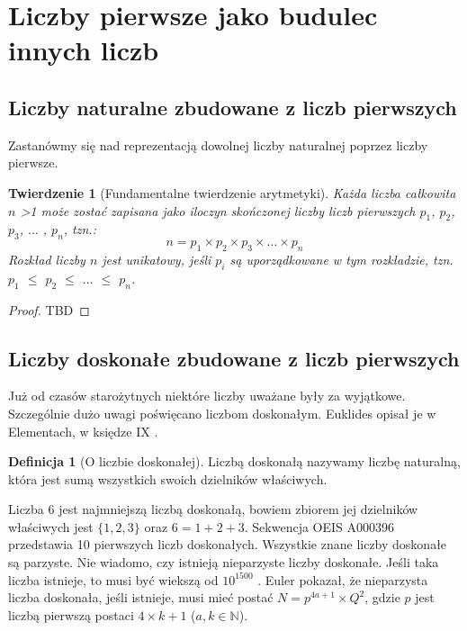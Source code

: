 \documentclass[10pt,onecolumn]{article}
\newtheorem{theorem}{Twierdzenie}
\theoremstyle{definition}
\newtheorem{definition}{Definicja}
\theoremstyle{hypothesis}
\theoremstyle{capability}
\begin{document}
\section{Liczby pierwsze jako budulec innych liczb}

\subsection{Liczby naturalne zbudowane z liczb pierwszych}

Zastanówmy się nad reprezentacją dowolnej liczby naturalnej poprzez liczby pierwsze.

\begin{theorem}[Fundamentalne twierdzenie arytmetyki]
Każda liczba całkowita $n$ \textgreater 1 może zostać zapisana jako iloczyn skończonej liczby liczb pierwszych $p_1$, $p_2$, $p_3$, $\ldots$ , $p_n$, tzn.: $$ n = p_1 \times p_2 \times p_3 \times \ldots \times p_n$$  Rozkład liczby $n$ jest unikatowy, jeśli $p_i$ są uporządkowane w tym rozkładzie, tzn. $p_1$ $\leq$ $p_2$ $\leq$ $\ldots$ $\leq$ $p_n$.
\end{theorem}
 
\begin{proof}
TBD
\end{proof}

\subsection{Liczby doskonałe zbudowane z liczb pierwszych}

Już od czasów starożytnych niektóre liczby uważane były za wyjątkowe. Szczególnie dużo uwagi poświęcano liczbom doskonałym. Euklides opisał je w Elementach, w księdze IX \cite{euklides}.

\begin{definition} [O liczbie doskonałej]
Liczbą doskonałą nazywamy liczbę naturalną, która jest sumą wszystkich swoich dzielników właściwych.
\end{definition}

Liczba $6$ jest najmniejszą liczbą doskonałą, bowiem zbiorem jej dzielników właściwych jest $\lbrace 1, 2, 3 \rbrace$ oraz $6 = 1 + 2 +3$. Sekwencja OEIS A000396 przedstawia 10 pierwszych liczb doskonałych.
Wszystkie znane liczby doskonałe są parzyste. Nie wiadomo, czy istnieją nieparzyste liczby doskonałe. Jeśli taka liczba istnieje, to musi być wiekszą od $10^{1500}$ \cite{ochemrao2012}. Euler pokazał, że nieparzysta liczba doskonała, jeśli istnieje, musi mieć postać $N = p^{4a+1} \times Q^2$, gdzie $p$ jest liczbą pierwszą postaci $4 \times k+1$ ($a, k \in \mathbb{N}$).
\end{document}

